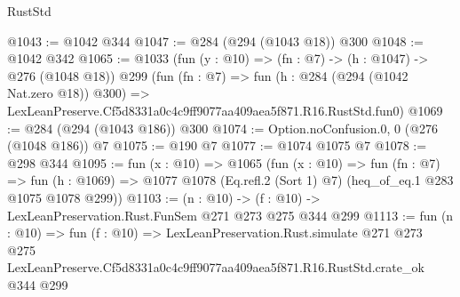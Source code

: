 \begin{lexlean}{RustStd}
\begin{coremodule}
@1043 := @1042 @344
@1047 := @284 (@294 (@1043 @18)) @300
@1048 := @1042 @342
@1065 := @1033
    (fun (y : @10) => (fn : @7) -> (h : @1047) -> @276 (@1048 @18))
    @299
    (fun (fn : @7) =>
    fun (h : @284 (@294 (@1042 Nat.zero @18)) @300) =>
    LexLeanPreserve.Cf5d8331a0c4c9ff9077aa409aea5f871.R16.RustStd.fun0)
@1069 := @284 (@294 (@1043 @186)) @300
@1074 := Option.noConfusion.{0, 0} (@276 (@1048 @186)) @7
@1075 := @190 @7
@1077 := @1074 @1075 @7
@1078 := @298 @344
@1095 := fun (x : @10) =>
  @1065
    (fun (x : @10) =>
    fun (fn : @7) =>
    fun (h : @1069) => @1077 @1078 (Eq.refl.{2} (Sort 1) @7) (heq_of_eq.{1} @283 @1075 @1078 @299))
@1103 := (n : @10) -> (f : @10) -> LexLeanPreservation.Rust.FunSem @271 @273 @275 @344 @299
@1113 := fun (n : @10) =>
  fun (f : @10) =>
  LexLeanPreservation.Rust.simulate
    @271
    @273
    @275
    LexLeanPreserve.Cf5d8331a0c4c9ff9077aa409aea5f871.R16.RustStd.crate_ok
    @344
    @299
\end{coremodule}
\end{lexlean}
